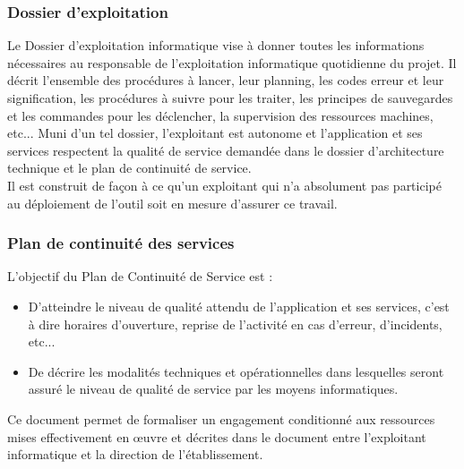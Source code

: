 \subsubsection{Dossier d'exploitation}
Le Dossier d'exploitation informatique vise à donner toutes les informations nécessaires au responsable de l'exploitation informatique quotidienne du projet. Il décrit l'ensemble des procédures à lancer, leur planning, les codes erreur et leur signification, les procédures à suivre pour les traiter, les principes de sauvegardes et les commandes pour les déclencher, la supervision des ressources machines, etc... Muni d'un tel dossier, l'exploitant est autonome et l'application et ses services respectent la qualité de service demandée dans le dossier d'architecture technique et le plan de continuité de service.
\\
Il est construit de façon à ce qu'un exploitant qui n'a absolument pas participé au déploiement de l'outil soit en mesure d'assurer ce travail.

\subsubsection{Plan de continuité des services}
L'objectif du Plan de Continuité de Service est :
\begin{itemize}[label=\textbullet]
 \item D'atteindre le niveau de qualité attendu de l'application et ses services, c'est à dire horaires d'ouverture, reprise de l'activité en cas d'erreur, d'incidents, etc...
 \item De décrire les modalités techniques et opérationnelles dans lesquelles seront assuré le niveau de qualité de service par les moyens informatiques.
\end{itemize}
Ce document permet de formaliser un engagement conditionné aux ressources mises effectivement en œuvre et décrites dans le document entre l'exploitant informatique et la direction de l'établissement.

